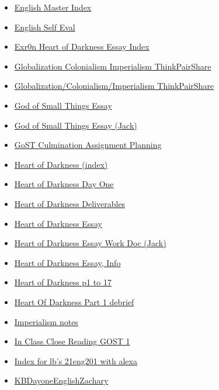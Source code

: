 \documentclass[11pt]{article}
\begin{document}
\begin{itemize}
\begin{itemize}
\begin{itemize}
\item \href{english/english10/KBEnglishMasterIndex.org}{English Master Index}
\item \href{english/english10/KBxEngSelfEval.org}{English Self Eval}
\item \href{english/english10/KBe20eng201retHeartOfDarknessEssay.org}{Exr0n Heart of Darkness Essay Index}
\item \href{english/english10/KB20200824144641.org}{Globalization Colonialism Imperialism ThinkPairShare}
\item \href{english/english10/KBe-2020eng201floD1Breakout.org}{Globalization/Colonialism/Imperialism ThinkPairShare}
\item \href{english/english10/KBe21eng201retGoSTEssay.org}{God of Small Things Essay}
\item \href{english/english10/KBhENG201GoSTEssayPlanningJack.org}{God of Small Things Essay (Jack)}
\item \href{english/english10/KBxGoSTCulminationPlanning.org}{GoST Culmination Assignment Planning}
\item \href{english/english10/KBhENG201HeartOfHardness.org}{Heart of Darkness (index)}
\item \href{english/english10/KBheartday1.org}{Heart of Darkness Day One}
\item \href{english/english10/KBe20eng201retHeartOfDarknessDump.org}{Heart of Darkness Deliverables}
\item \href{english/english10/KBxHoDEssay.org}{Heart of Darkness Essay}
\item \href{english/english10/KBhENG201HODEssayPlanning.org}{Heart of Darkness Essay Work Doc (Jack)}
\item \href{english/english10/KBENG201HoDLitAnalysisEssay.org}{Heart of Darkness Essay, Info}
\item \href{english/english10/KBhENG201Page0t17.org}{Heart of Darkness p1 to 17}
\item \href{english/english10/KBe20eng201part1.org}{Heart Of Darkness Part 1 debrief}
\item \href{english/english10/KBe2020eng201floImperalismNotes.org}{Imperialism notes}
\item \href{english/english10/KBxInClassCloseReadingGOST1.org}{In Class Close Reading GOST 1}
\item \href{english/english10/KBe21eng201index.org}{Index for lb's 21eng201 with alexa}
\item \href{english/english10/KBDayoneEnglishZachary.org}{KBDayoneEnglishZachary}

\end{itemize}
\end{itemize}
\end{itemize}
\end{document}
